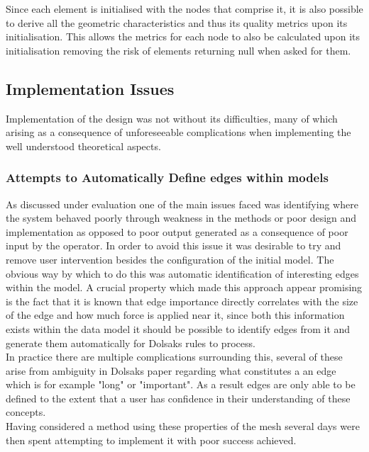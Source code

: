 Since each element is initialised with the nodes that comprise it, it is also possible to derive all the geometric characteristics and thus its quality metrics upon its initialisation. This allows the metrics for each node to also be calculated upon its initialisation removing the risk of elements returning null when asked for them.




\subsection{Implementation Issues}
Implementation of the design was not without its difficulties, many of which arising as a consequence of unforeseeable complications when implementing the well understood theoretical aspects.


\subsubsection{Attempts to Automatically Define edges within models}
As discussed under evaluation one of the main issues faced was identifying where the system behaved poorly through weakness in the methods or poor design and implementation as opposed to poor output generated as a consequence of poor input by the operator. In order to avoid this issue it was desirable to try and remove user intervention besides the configuration of the initial model. The obvious way by which to do this was automatic identification of interesting edges within the model. A crucial property which made this approach appear promising is the fact that it is known that edge importance directly correlates with the size of the edge and how much force is applied near it, since both this information exists within the data model it should be possible to identify edges from it and generate them automatically for Dolsaks rules to process.  \\


\noindent
In practice there are multiple complications surrounding this, several of these arise from ambiguity in Dolsaks paper regarding what constitutes a an edge which is for example "long" or "important". As a result edges are only able to be defined to the extent that a user has confidence in their understanding of these concepts. \\ 


Having considered a method using these properties of the mesh several days were then spent attempting to implement it with poor success achieved.
